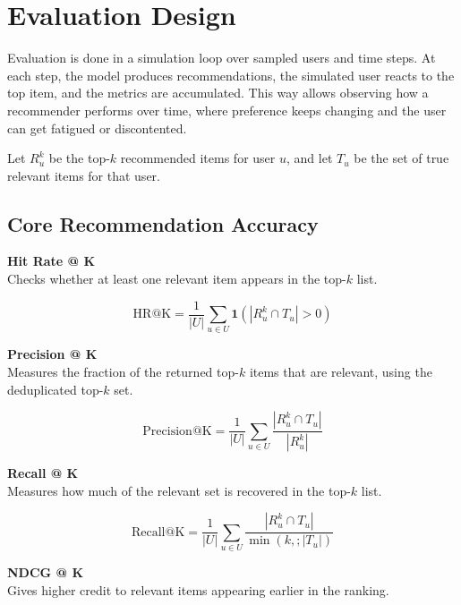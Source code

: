 \section{Evaluation Design}

Evaluation is done in a simulation loop over sampled users and time steps. 
At each step, the model produces recommendations, the simulated user reacts to the top item, and the metrics are accumulated. 
This way allows observing how a recommender performs over time, where preference keeps changing and the user can get fatigued or discontented.

Let $R_u^k$ be the top-$k$ recommended items for user $u$, and let $T_u$ be the set of true relevant items for that user. 



\subsection{Core Recommendation Accuracy}


\noindent \textbf{Hit Rate @ K} \\
Checks whether at least one relevant item appears in the top-$k$ list.

\begin{equation}
    \mathrm{HR@K}=\frac{1}{|U|}\sum_{u\in U}\mathbf{1}\left(|R_u^k\cap T_u|>0\right)
\end{equation}


\noindent \textbf{Precision @ K} \\
Measures the fraction of the returned top-$k$ items that are relevant, using the deduplicated top-$k$ set.

\begin{equation}
    \mathrm{Precision@K}=\frac{1}{|U|}\sum_{u\in U}\frac{|R_u^k\cap T_u|}{|R_u^k|}
\end{equation}


\noindent \textbf{Recall @ K} \\
Measures how much of the relevant set is recovered in the top-$k$ list.

\begin{equation}
    \mathrm{Recall@K}=\frac{1}{|U|}\sum_{u\in U}\frac{|R_u^k\cap T_u|}{\min(k,;|T_u|)}
\end{equation}


\noindent \textbf{NDCG @ K} \\
Gives higher credit to relevant items appearing earlier in the ranking.

